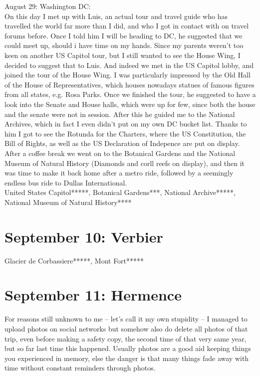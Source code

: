 August 29: Washington DC:\\
On this day I met up with Luis, an actual tour and travel guide who has travelled the world far more than I did, and who I got in contact with on travel forums before. Once I told him I will be heading to DC, he suggested that we could meet up, should i have time on my hands. Since my parents weren't too keen on another US Capitol tour, but I still wanted to see the House Wing, I decided to suggest that to Luis. And indeed we met in the US Capitol lobby, and joined the tour of the House Wing. I was particularly impressed by the Old Hall of the House of Representatives, which houses nowadays statues of famous figures from all states, e.g. Rosa Parks. Once we finished the tour, he suggested to have a look into the Senate and House halls, which were up for few, since both the house and the senate were not in session. After this he guided me to the National Archives, which in fact I even didn't put on my own DC bucket list. Thanks to him I got to see the Rotunda for the Charters, where the US Constitution, the Bill of Rights, as well as the US Declaration of Indepence are put on display. After a coffee break we went on to the Botanical Gardens and the National Museum of Natural History (Diamonds and corll reefs on display), and then it was time to make it back home after a metro ride, followed by a seemingly endless bus ride to Dullas International.\\

United States Capitol*****, Botanical Gardens***, National Archive*****, National Museum of Natural History****

\section{September 10: Verbier}
\label{Verbier2018}

Glacier de Corbassiere*****, Mont Fort*****

\section{September 11: Hermence}
\label{GrandeDixence2016}

For reasons still unknown to me -- let's call it my own stupidity -- I managed to upload photos on social networks but somehow also do delete all photos of that trip, even before making a safety copy, the second time of that very same year, but so far last time this happened. Usually photos are a good aid keeping things you experienced in memory, else the danger is that many things fade away with time without constant reminders through photos.\\


